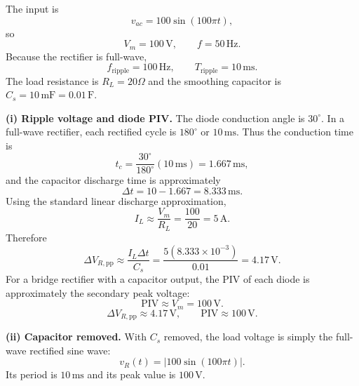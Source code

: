 \documentclass[11pt,a4paper]{article}
\newcommand{\pp}{\mathrm{pp}}
\newcommand{\unit}[1]{\,\mathrm{#1}}
\newcommand{\answerbox}[1]{\[\boxed{#1}\]}
\begin{document}
The input is
\[
v_{ac}=100\sin(100\pi t),
\]
so
\[
V_m=100\unit{V},\qquad f=50\unit{Hz}.
\]
Because the rectifier is full-wave,
\[
f_{\mathrm{ripple}}=100\unit{Hz},\qquad T_{\mathrm{ripple}}=10\unit{ms}.
\]
The load resistance is $R_L=20\Omega$ and the smoothing capacitor is $C_s=10\unit{mF}=0.01\unit{F}$.

\textbf{(i) Ripple voltage and diode PIV.} The diode conduction angle is $30^\circ$. In a full-wave rectifier, each rectified cycle is $180^\circ$ or $10\unit{ms}$. Thus the conduction time is
\[
t_c=\frac{30^\circ}{180^\circ}(10\unit{ms})=1.667\unit{ms},
\]
and the capacitor discharge time is approximately
\[
\Delta t=10-1.667=8.333\unit{ms}.
\]
Using the standard linear discharge approximation,
\[
I_L\approx \frac{V_m}{R_L}=\frac{100}{20}=5\unit{A}.
\]
Therefore
\[
\Delta V_{R,\pp}\approx \frac{I_L\Delta t}{C_s}
=\frac{5(8.333\times10^{-3})}{0.01}=4.17\unit{V}.
\]
For a bridge rectifier with a capacitor output, the PIV of each diode is approximately the secondary peak voltage:
\[
\mathrm{PIV}\approx V_m=100\unit{V}.
\]
\answerbox{\Delta V_{R,\pp}\approx 4.17\unit{V},\qquad \mathrm{PIV}\approx 100\unit{V}.}

\textbf{(ii) Capacitor removed.} With $C_s$ removed, the load voltage is simply the full-wave rectified sine wave:
\[
v_R(t)=|100\sin(100\pi t)|.
\]
Its period is $10\unit{ms}$ and its peak value is $100\unit{V}$.

\begin{center}

\vspace{1em}

\end{center}
\end{document}
